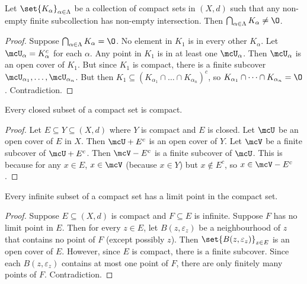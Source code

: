 
\begin{theorem}
    Let $\set{K_\alpha}_{\alpha \in \Lambda}$ be a collection of compact
    sets in $(X, d)$ such that any non-empty finite subcollection has
    non-empty intersection.
    Then $\bigcap_{\alpha \in \Lambda} K_\alpha \neq \O$.
\end{theorem}
\begin{proof}
    Suppose $\bigcap_{\alpha \in \Lambda} K_\alpha = \O$.
    No element in $K_1$ is in every other $K_\alpha$.
    Let $\mcU_\alpha = K_\alpha^c$ for each $\alpha$.
    Any point in $K_1$ is in at least one $\mcU_\alpha$.
    Then $\mcU_\alpha$ is an open cover of $K_1$.
    But since $K_1$ is compact, there is a finite subcover
    $\mcU_{\alpha_1}, \dots, \mcU_{\alpha_n}$.
    But then $K_1 \subseteq (K_{\alpha_1} \cap \dots \cap K_{\alpha_n})^c$,
    so $K_{\alpha_1} \cap \dots \cap K_{\alpha_n} = \O$.
    Contradiction.
\end{proof}

\begin{theorem}
    Every closed subset of a compact set is compact.
\end{theorem}
\begin{proof}
    Let $E \subseteq Y \subseteq (X, d)$ where $Y$ is compact and $E$ is
    closed.
    Let $\mcU$ be an open cover of $E$ in $X$.
    Then $\mcU + E^c$ is an open cover of $Y$.
    Let $\mcV$ be a finite subcover of $\mcU + E^c$.
    Then $\mcV - E^c$ is a finite subcover of $\mcU$.
    This is because for any $x \in E$, $x \in \mcV$ (because $x \in Y$) but
    $x \notin E^c$, so $x \in \mcV - E^c$.
\end{proof}

\begin{theorem}
    Every infinite subset of a compact set has a limit point in the compact
    set.
\end{theorem}
\begin{proof}
    Suppose $E \subseteq (X, d)$ is compact and $F \subseteq E$ is infinite.
    Suppose $F$ has no limit point in $E$.
    Then for every $z \in E$, let $B(z, \varepsilon_z)$ be a neighbourhood
    of $z$ that contains no point of $F$ (except possibly $z$).
    Then $\set{B(z, \varepsilon_z)}_{z \in E}$ is an open cover of $E$.
    However, since $E$ is compact, there is a finite subcover.
    Since each $B(z, \varepsilon_z)$ contains at most one point of $F$,
    there are only finitely many points of $F$.
    Contradiction.
\end{proof}

